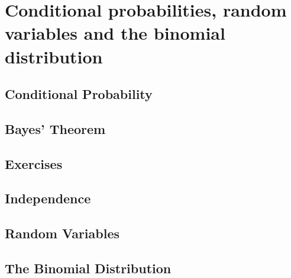 \section{Conditional probabilities, random variables and the binomial distribution}

\subsection{Conditional Probability}

\subsection{Bayes' Theorem}

\subsection{Exercises}

\subsection{Independence}

\subsection{Random Variables}

\subsection{The Binomial Distribution}